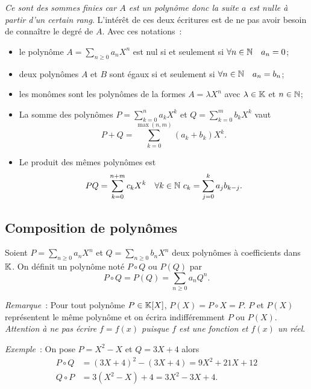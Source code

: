 \emph{Ce sont des sommes finies car \(A\) est un polynôme donc la suite \(a\) 
est nulle à partir d'un certain rang}. L'intérêt de ces deux écritures est de ne 
pas avoir besoin de connaître le degré de \(A\). Avec ces notations~:
\begin{itemize}
  \item le polynôme \(A = \sum_{n\geqslant 0} a_n X^n\) est nul si et seulement si 
    \(\forall n \in \mathbb{N} \quad a_n =0\);
  \item deux polynômes \(A\) et \(B\) sont égaux si et seulement si \(\forall n 
    \in \mathbb{N} \quad a_n =b_n\);
  \item les monômes sont les polynômes de la formes \(A = \lambda X^n\) avec 
    \(\lambda \in \mathbb{K}\) et \(n \in \mathbb{N}\);
  \item La somme des polynômes \(P = \sum_{k = 0}^n a_k X^k\) et \(Q = \sum_{k = 0}^m 
    b_k X^k\) vaut
    \begin{equation}
      P+Q = \sum_{k = 0}^{\max(n,m)}(a_k+b_k) X^k.
    \end{equation}
  \item Le produit des mêmes polynômes est
    \begin{equation}
      PQ = \sum_{k = 0}^{n+m} c_k X^k \quad \forall k \in \mathbb{N} \ c_k = \sum_{j = 0}^k 
      a_j b_{k-j}.
    \end{equation}
\end{itemize}

\subsection{Composition de polynômes}

\begin{defdef}
  Soient \(P = \sum_{n \geqslant 0} a_n X^n\) et \(Q = \sum_{n \geqslant 0} b_n 
  X^n\) deux polynômes à coefficients dans \(\mathbb{K}\). On définit un polynôme noté 
  \(P \circ Q\) ou \(P(Q)\) par
  \begin{equation}
    P \circ Q = P(Q) = \sum_{n \geqslant 0} a_n Q^n.
  \end{equation}
\end{defdef}

\emph{Remarque}~: Pour tout polynôme \(P \in \mathbb{K}[X]\), \(P(X) = P \circ X = P\). 
\(P\) et \(P(X)\) représentent le même polynôme et on écrira indifféremment 
\(P\) ou \(P(X)\). \emph{Attention à ne pas écrire \(f = f(x)\) puisque \(f\) est 
une fonction et \(f(x)\) un réel}.

\emph{Exemple}~: On pose \(P = X^2-X\) et \(Q = 3X+4\) alors
\begin{align}
  P \circ Q &= (3X+4)^2-(3X+4) = 9X^2+21X+12\\
  Q \circ P &= 3(X^2-X)+4 = 3X^2-3X+4.
\end{align}

